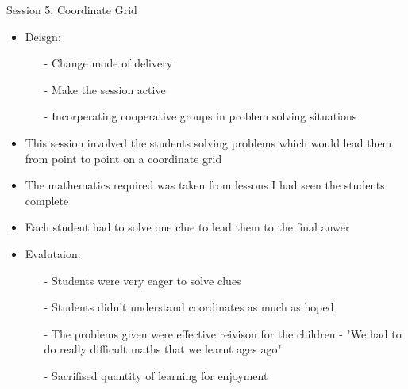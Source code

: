 \documentclass{beamer}  %
\begin{document}
\begin{frame}{Session 5: Coordinate Grid}
    \begin{itemize}
        \item Deisgn:
        \begin{itemize}
            \item[-] Change mode of delivery 
            \item[-] Make the session active
            \item[-] Incorperating cooperative groups in problem solving situations 
        \end{itemize}
        \item This session involved the students solving problems which would lead them from point to point on a coordinate grid
        \item The mathematics required was taken from lessons I had seen the students complete
        \item Each student had to solve one clue to lead them to the final anwer
        \item Evalutaion:
        \begin{itemize}
            \item[-] Students were very eager to solve clues
            \item[-] Students didn't understand coordinates as much as hoped
            \item[-] The problems given were effective reivison for the children - "We had to do really difficult maths that we learnt ages ago"
            \item[-] Sacrifised quantity of learning for enjoyment
        \end{itemize}
    \end{itemize}
\end{frame}
\end{document}
